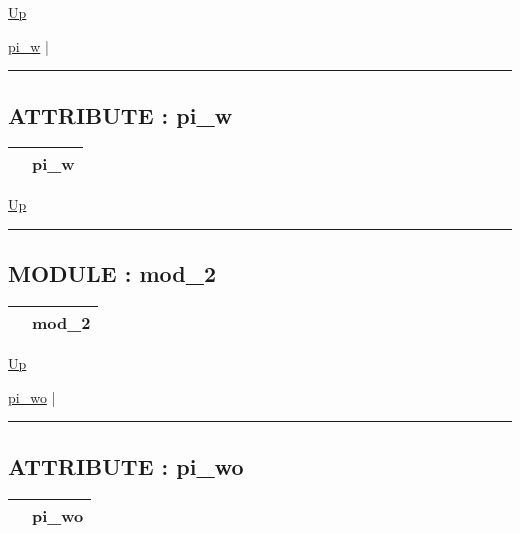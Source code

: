 \hyperlink{ecldoc:example}{Up}

\par


\hyperlink{ecldoc:example.mod_1.pi_w}{pi\_w}  |

\rule{\textwidth}{0.4pt}

\subsection*{ATTRIBUTE : pi\_w}
\hypertarget{ecldoc:example.mod_1.pi_w}{}

{\renewcommand{\arraystretch}{1.5}
\begin{tabularx}{\textwidth}{|>{\raggedright\arraybackslash}l|X|}
\hline
\hspace{0pt} & pi\_w \\
\hline
\end{tabularx}
}

\hyperlink{ecldoc:example.mod_1}{Up}

\par


\rule{\textwidth}{0.4pt}


\subsection*{MODULE : mod\_2}
\hypertarget{ecldoc:example.mod_2}{}

{\renewcommand{\arraystretch}{1.5}
\begin{tabularx}{\textwidth}{|>{\raggedright\arraybackslash}l|X|}
\hline
\hspace{0pt} & mod\_2 \\
\hline
\end{tabularx}
}

\hyperlink{ecldoc:example}{Up}

\par


\hyperlink{ecldoc:example.mod_2.pi_wo}{pi\_wo}  |

\rule{\textwidth}{0.4pt}

\subsection*{ATTRIBUTE : pi\_wo}
\hypertarget{ecldoc:example.mod_2.pi_wo}{}

{\renewcommand{\arraystretch}{1.5}
\begin{tabularx}{\textwidth}{|>{\raggedright\arraybackslash}l|X|}
\hline
\hspace{0pt} & pi\_wo \\
\hline
\end{tabularx}
}

